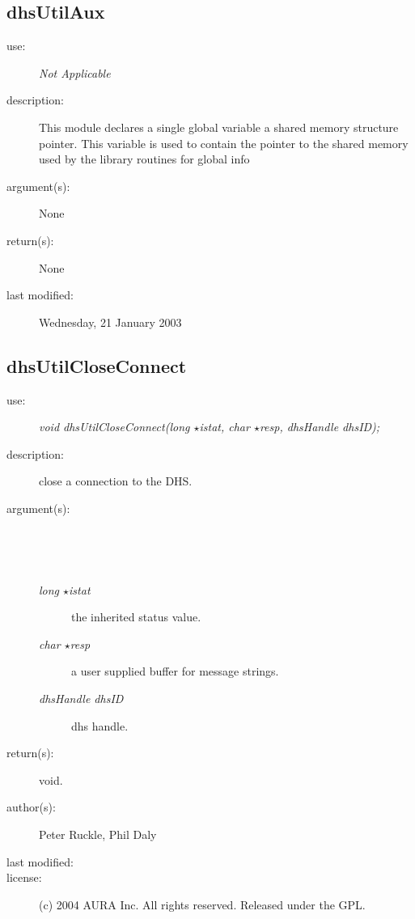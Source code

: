\subsection {dhsUtilAux} \begin{description} \item[\sc use:] \emph{Not Applicable} \item[\sc description:] This module declares a single global variable a shared memory structure pointer. This variable is used to contain the pointer to the shared memory used by the library routines for global info \item[\sc argument(s):] None \item[\sc return(s):] None \item[\sc last modified:] Wednesday, 21 January 2003 \end{description}
\subsection {dhsUtilCloseConnect} \begin{description} \item[\sc use:] \emph{void dhsUtilCloseConnect(long $\star$istat, char $\star$resp, dhsHandle dhsID);} \item[\sc description:] close a connection to the DHS. \item[\sc argument(s):] \begin{description} \item[\ ] \ \item[\emph{long $\star$istat}] the inherited status value. \item[\emph{char $\star$resp}] a user supplied buffer for message strings. \item[\emph{dhsHandle dhsID}] dhs handle. \end{description} \item[\sc return(s):] void. \item[\sc author(s):] Peter Ruckle, Phil Daly \item[\sc last modified:] \item[\sc license:] (c) 2004 AURA Inc. All rights reserved. Released under the GPL. \end{description}
